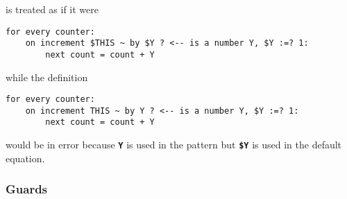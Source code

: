 \documentclass[12pt]{article}
\newcommand{\TT}[1]{{\tt \bfseries #1}}
\newenvironment{indpar}[1][0.3in]%
	{\begin{list}{}%
		     {\setlength{\itemsep}{0in}%
		      \setlength{\topsep}{0in}%
		      \setlength{\parsep}{1ex}%
		      \setlength{\labelwidth}{#1}%
		      \setlength{\leftmargin}{#1}%
		      \addtolength{\leftmargin}{\labelsep}}%
	 \item}%
	{\end{list}}
\begin{document}
is treated as if it were

\begin{indpar}\begin{verbatim}
for every counter:
    on increment $THIS ~ by $Y ? <-- is a number Y, $Y :=? 1:
        next count = count + Y
\end{verbatim}\end{indpar}

while the definition

\begin{indpar}\begin{verbatim}
for every counter:
    on increment THIS ~ by Y ? <-- is a number Y, $Y :=? 1:
        next count = count + Y
\end{verbatim}\end{indpar}

would be in error because \TT{Y} is used in the pattern but
\TT{\$Y} is used in the default equation.

\subsubsection{Guards}
\label{GUARDS}
\end{document}
